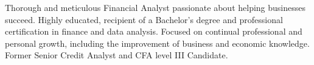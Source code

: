 

\begin{cvparagraph}

Thorough and meticulous Financial Analyst passionate about helping businesses succeed.
Highly educated, recipient of a Bachelor's degree and professional certification in finance and data analysis. 
Focused on continual professional and personal growth, including the improvement of business and economic knowledge.
Former Senior Credit Analyst and CFA level III Candidate.
\end{cvparagraph}
